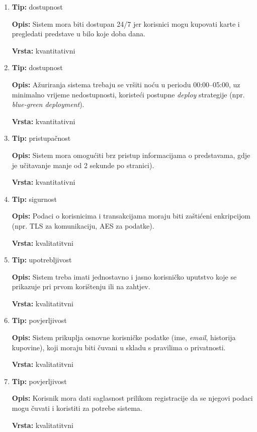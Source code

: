\begin{enumerate}
    \item\textbf{Tip:} dostupnost

    
    \textbf{Opis:} Sistem mora biti dostupan 24/7 jer korisnici mogu kupovati karte i pregledati predstave u bilo koje doba dana.

    
    \textbf{Vrsta:} kvantitativni
    \item\textbf{Tip:} dostupnost

    
    \textbf{Opis:} Ažuriranja sistema trebaju se vršiti noću u periodu 00:00–05:00, uz minimalno vrijeme nedostupnosti, koristeći postupne \textit{deploy} strategije (npr. \textit{blue-green deployment}).

    
    \textbf{Vrsta:} kvantitativni
    \item\textbf{Tip:} pristupačnost

    
    \textbf{Opis:} Sistem mora omogućiti brz pristup informacijama o predstavama, gdje je učitavanje manje od 2 sekunde po stranici).

    
    \textbf{Vrsta:} kvantitativni
    \item\textbf{Tip:} sigurnost

    
    \textbf{Opis:} Podaci o korisnicima i transakcijama moraju biti zaštićeni enkripcijom (npr. TLS za komunikaciju, AES za podatke).

    
    \textbf{Vrsta:} kvalitatitvni
    \item\textbf{Tip:} upotrebljivost

    
    \textbf{Opis:} Sistem treba imati jednostavno i jasno korisničko uputstvo koje se prikazuje pri prvom korištenju ili na zahtjev.

    
    \textbf{Vrsta:} kvalitatitvni
    \item\textbf{Tip:} povjerljivost

    
    \textbf{Opis:} Sistem prikuplja osnovne korisničke podatke (ime, \textit{email}, historija kupovine), koji moraju biti čuvani u skladu s pravilima o privatnosti.

    
    \textbf{Vrsta:} kvalitatitvni
    \item\textbf{Tip:} povjerljivost

    
    \textbf{Opis:} Korisnik mora dati saglasnost prilikom registracije da se njegovi podaci mogu čuvati i koristiti za potrebe sistema.

    
    \textbf{Vrsta:} kvalitatitvni
\end{enumerate}

